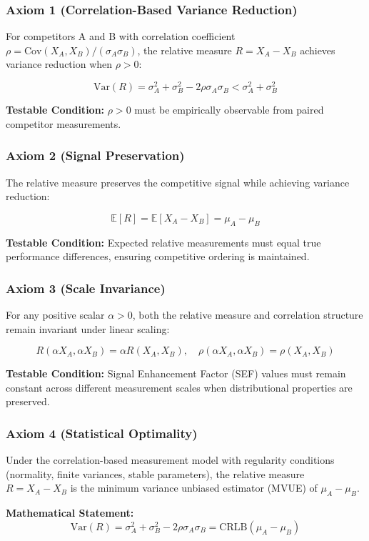 \subsubsection{Axiom 1 (Correlation-Based Variance Reduction)}
For competitors A and B with correlation coefficient $\rho = \text{Cov}(X_A, X_B)/(\sigma_A \sigma_B)$, the relative measure $R = X_A - X_B$ achieves variance reduction when $\rho > 0$:

$$\text{Var}(R) = \sigma_A^2 + \sigma_B^2 - 2\rho\sigma_A\sigma_B < \sigma_A^2 + \sigma_B^2$$

\textbf{Testable Condition:} $\rho > 0$ must be empirically observable from paired competitor measurements.

\subsubsection{Axiom 2 (Signal Preservation)}
The relative measure preserves the competitive signal while achieving variance reduction:

$$\mathbb{E}[R] = \mathbb{E}[X_A - X_B] = \mu_A - \mu_B$$

\textbf{Testable Condition:} Expected relative measurements must equal true performance differences, ensuring competitive ordering is maintained.

\subsubsection{Axiom 3 (Scale Invariance)}
For any positive scalar $\alpha > 0$, both the relative measure and correlation structure remain invariant under linear scaling:

$$R(\alpha X_A, \alpha X_B) = \alpha R(X_A, X_B), \quad \rho(\alpha X_A, \alpha X_B) = \rho(X_A, X_B)$$

\textbf{Testable Condition:} Signal Enhancement Factor (SEF) values must remain constant across different measurement scales when distributional properties are preserved.

\subsubsection{Axiom 4 (Statistical Optimality)}
Under the correlation-based measurement model with regularity conditions (normality, finite variances, stable parameters), the relative measure $R = X_A - X_B$ is the minimum variance unbiased estimator (MVUE) of $\mu_A - \mu_B$.

\textbf{Mathematical Statement:}
$$\text{Var}(R) = \sigma_A^2 + \sigma_B^2 - 2\rho\sigma_A\sigma_B = \text{CRLB}(\mu_A - \mu_B)$$

